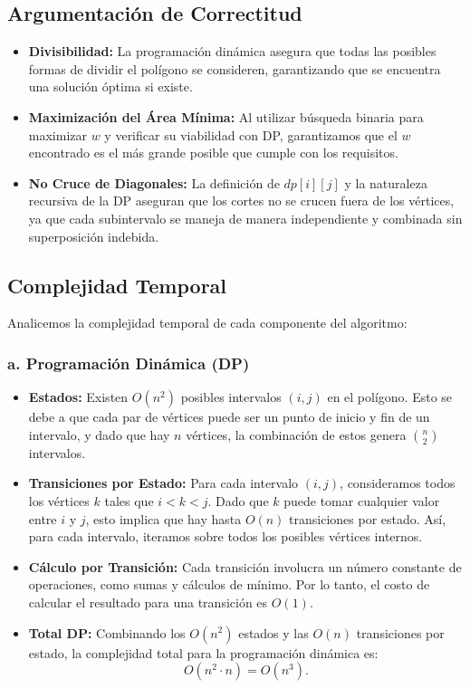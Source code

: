 \documentclass{article}
\begin{document}
\subsection{Argumentación de Correctitud}

\begin{itemize}
    \item \textbf{Divisibilidad:} La programación dinámica asegura que todas las posibles formas de dividir el polígono se consideren, garantizando que se encuentra una solución óptima si existe.
    \item \textbf{Maximización del Área Mínima:} Al utilizar búsqueda binaria para maximizar \( w \) y verificar su viabilidad con DP, garantizamos que el \( w \) encontrado es el más grande posible que cumple con los requisitos.
    \item \textbf{No Cruce de Diagonales:} La definición de \( dp[i][j] \) y la naturaleza recursiva de la DP aseguran que los cortes no se crucen fuera de los vértices, ya que cada subintervalo se maneja de manera independiente y combinada sin superposición indebida.
\end{itemize}

\subsection{Complejidad Temporal}

Analicemos la complejidad temporal de cada componente del algoritmo:

\subsubsection{a. Programación Dinámica (DP)}

\begin{itemize}
    \item \textbf{Estados:} Existen \( O(n^2) \) posibles intervalos \( (i, j) \) en el polígono. Esto se debe a que cada par de vértices puede ser un punto de inicio y fin de un intervalo, y dado que hay \( n \) vértices, la combinación de estos genera \( \binom{n}{2} \) intervalos.
    
    \item \textbf{Transiciones por Estado:} Para cada intervalo \( (i, j) \), consideramos todos los vértices \( k \) tales que \( i < k < j \). Dado que \( k \) puede tomar cualquier valor entre \( i \) y \( j \), esto implica que hay hasta \( O(n) \) transiciones por estado. Así, para cada intervalo, iteramos sobre todos los posibles vértices internos.

    \item \textbf{Cálculo por Transición:} Cada transición involucra un número constante de operaciones, como sumas y cálculos de mínimo. Por lo tanto, el costo de calcular el resultado para una transición es \( O(1) \).

    \item \textbf{Total DP:} Combinando los \( O(n^2) \) estados y las \( O(n) \) transiciones por estado, la complejidad total para la programación dinámica es:
    \[
    O(n^2 \cdot n) = O(n^3).
    \]
\end{itemize}
\end{document}
